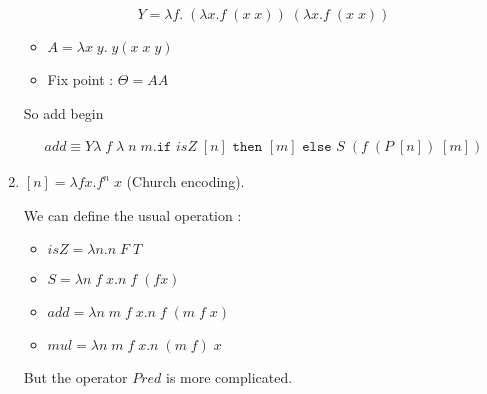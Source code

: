 \begin{enumerate}
      $$Y = \lambda f.\;(\lambda x. f\;(x\;x))\;(\lambda x.f\;(x\;x))$$

      \begin{itemize}
        \item $A = \lambda x\;y.\; y(x\;x\;y)$
        \item Fix point : $\Theta = A A$ 
      \end{itemize}

      So add begin 

      \begin{align*}
        add \equiv Y \lambda\;f\; \lambda\;n\;m.\texttt{if } isZ\;[n]
          \texttt{ then } [m] \texttt{ else } S\; (f\;(P\;[n])\;[m])
      \end{align*}

    \item $[n] = \lambda f x.f^n\;x$ (Church encoding).

      We can define the usual operation :
      
      \begin{itemize}
        \item $isZ = \lambda n. n\;F\;T$
        \item $S = \lambda n\;f\;x.n\;f\;(f x) $
        \item $add = \lambda n\;m\;f\;x. n\;f\;(m\;f\;x)$
        \item $mul = \lambda n\;m\;f\;x. n\;(m\;f)\;x$
      \end{itemize}

      But the operator $Pred$ is more complicated.
  \end{enumerate}

